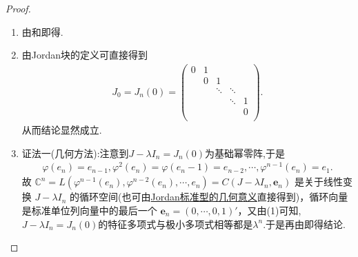 \documentclass[../../main.tex]{subfiles}%
\begin{document}
\begin{proof}
\begin{enumerate}[(1)]
\item 由和即得.

\item 由Jordan块的定义可直接得到
\begin{align*}
J_0=J_n(0)=\left( \begin{matrix}
0&		1&		&		&		\\
&		0&		1&		&		\\
&		&		\ddots&		\ddots&		\\
&		&		&		\ddots&		1\\
&		&		&		&		0\\
\end{matrix} \right) .
\end{align*}
从而结论显然成立.

\item {\color{blue}证法一(几何方法):}注意到$J-\lambda I_n=J_n(0)$为基础幂零阵,于是
\begin{align*}
\varphi(e_n)=e_{n-1},\varphi^2(e_n)=\varphi(e_n-1)=e_{n-2},\cdots,\varphi^{n-1}(e_n)=e_1.
\end{align*}
故
$\mathbb{C}^n =L(\varphi^{n-1}(e_n),\varphi^{n-2}(e_n),\cdots,e_n)=C(J - \lambda I_n, \boldsymbol{e}_n)$ 是关于线性变换 $J - \lambda I_n$ 的循环空间(也可由\hyperref[theorem:Jordan标准型的几何意义]{Jordan标准型的几何意义}直接得到)，循环向量是标准单位列向量中的最后一个 $\boldsymbol{e}_n = (0, \cdots, 0, 1)'$，又由(1)可知,$J-\lambda I_n=J_n(0)$的特征多项式与极小多项式相等都是$\lambda^n$.于是再由即得结论.


\end{enumerate}
\end{proof}
\end{document}
